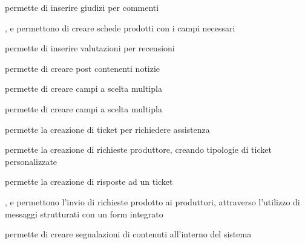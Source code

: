 {}
{ permette di inserire giudizi per commenti}


{, }
{ e  permettono di creare schede prodotti con i campi necessari}


{}
{ permette di inserire valutazioni per recensioni}


{}
{ permette di creare post contenenti notizie}


{}
{ permette di creare campi a scelta multipla}


{}
{ permette di creare campi a scelta multipla}


{}
{ permette la creazione di ticket per richiedere assistenza}


{}
{ permette la creazione di richieste produttore, creando tipologie di ticket personalizzate}


{}
{ permette la creazione di risposte ad un ticket}


{, }
{ e  permettono l'invio di richieste prodotto ai produttori, attraverso l'utilizzo di messaggi strutturati con un form integrato}


{}
{ permette di creare segnalazioni di contenuti all'interno del sistema}

